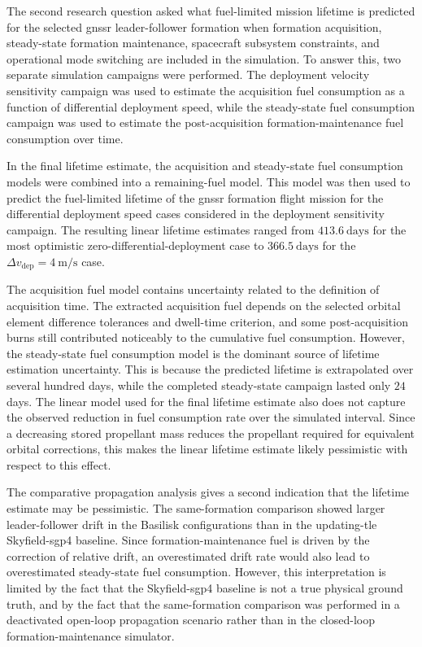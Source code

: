 The second research question asked what fuel-limited mission lifetime is predicted for the selected \gls{gnssr} leader-follower formation when formation acquisition, steady-state formation maintenance, spacecraft subsystem constraints, and operational mode switching are included in the simulation. To answer this, two separate simulation campaigns were performed. The deployment velocity sensitivity campaign was used to estimate the acquisition fuel consumption as a function of differential deployment speed, while the steady-state fuel consumption campaign was used to estimate the post-acquisition formation-maintenance fuel consumption over time.

In the final lifetime estimate, the acquisition and steady-state fuel consumption models were combined into a remaining-fuel model. This model was then used to predict the fuel-limited lifetime of the \gls{gnssr} formation flight mission for the differential deployment speed cases considered in the deployment sensitivity campaign. The resulting linear lifetime estimates ranged from $413.6~\mathrm{days}$ for the most optimistic zero-differential-deployment case to $366.5~\mathrm{days}$ for the $\Delta v_{\mathrm{dep}}=4~\mathrm{m/s}$ case.

The acquisition fuel model contains uncertainty related to the definition of acquisition time. The extracted acquisition fuel depends on the selected orbital element difference tolerances and dwell-time criterion, and some post-acquisition burns still contributed noticeably to the cumulative fuel consumption. However, the steady-state fuel consumption model is the dominant source of lifetime estimation uncertainty. This is because the predicted lifetime is extrapolated over several hundred days, while the completed steady-state campaign lasted only $24$ days. The linear model used for the final lifetime estimate also does not capture the observed reduction in fuel consumption rate over the simulated interval. Since a decreasing stored propellant mass reduces the propellant required for equivalent orbital corrections, this makes the linear lifetime estimate likely pessimistic with respect to this effect.

The comparative propagation analysis gives a second indication that the lifetime estimate may be pessimistic. The same-formation comparison showed larger leader-follower drift in the Basilisk configurations than in the updating-\gls{tle} Skyfield-\gls{sgp4} baseline. Since formation-maintenance fuel is driven by the correction of relative drift, an overestimated drift rate would also lead to overestimated steady-state fuel consumption. However, this interpretation is limited by the fact that the Skyfield-\gls{sgp4} baseline is not a true physical ground truth, and by the fact that the same-formation comparison was performed in a deactivated open-loop propagation scenario rather than in the closed-loop formation-maintenance simulator.

